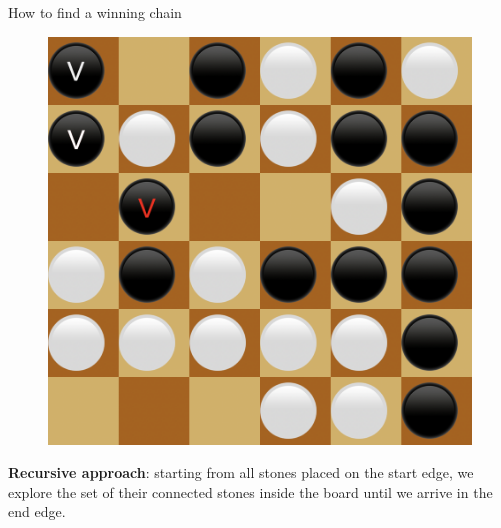 \documentclass{beamer}
\begin{document}
\begin{frame}{How to find a winning chain}
{		\begin{figure}[t]
			\includegraphics[scale=0.2]{images/chain/3.png}
		\end{figure}
		
		\textbf{Recursive approach}: starting from all stones placed on the start edge, we explore the set of their connected stones inside the board until we arrive in the end edge.
	}

\end{frame}
\end{document}
